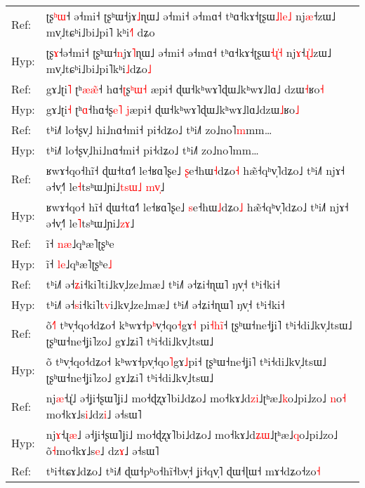 \documentclass[10pt]{article}
\DeclareRobustCommand{\hl}[1]{{\textcolor{red}{#1}}}
\begin{document}
\begin{longtable}{ll}
\midrule 
Ref: & ʈʂ\hl{ʰ}\hl{ɯ}˧\hl{ }ə˧mi˧ ʈʂʰɯ˧jɤ\hl{˩}ɳɯ˩ ə˧mi˧ ə˧mɑ˧ tʰɑ˧kɤ˧ʈʂɯ\hl{˩}\hl{l}\hl{e}\hl{˩} nj\hl{æ}˧zɯ˩ mv̩˩tɕʰi˩bi˩pi˥\hl{ }kʰi\hl{˧}\hl{˥}\hl{ }dʑo \\ 
Hyp: & ʈʂ\hl{ɤ}˧ə˧mi˧ ʈʂʰɯ˧\hl{n}jɤ\hl{˥}ɳɯ˩ ə˧mi˧ ə˧mɑ˧ tʰɑ˧kɤ˧ʈʂɯ\hl{˧}\hl{ɻ}\hl{̍}\hl{˧} nj\hl{ɤ}˧\hl{ɻ}\hl{̍}\hl{˩}zɯ˩ mv̩˩tɕʰi˩bi˩pi˥kʰi\hl{˩}dʑo\hl{˩} \\ 
\midrule 
Ref: & gɤ˩ʈi\hl{˥} ʈʰ\hl{æ}\hl{æ}\hl{̃}˧\hl{ }hɑ˧\hl{ʈ}ʂ\hl{ʰ}\hl{ɯ}\hl{˧}\hl{ }æpi˧ ɖɯ˧kʰwɤ˥ɖɯ˩kʰwɤ˩lɑ˩\hl{ }dzɯ\hl{˧}ʁo\hl{˧} \\ 
Hyp: & gɤ˩ʈi\hl{˧} ʈʰ\hl{ɑ}˧hɑ˧ʂ\hl{e}\hl{˥}\hl{ }\hl{j}æpi˧ ɖɯ˧kʰwɤ˥ɖɯ˩kʰwɤ˩lɑ˩dzɯ\hl{˩}ʁo\hl{˩} \\ 
\midrule 
Ref: & tʰi˩˥ lo˧ʂv̩˩\hl{ }hi˩nɑ˧mi˧ pi˧dʑo˩ tʰi˩˥ zo˩no˥\hl{m}mm… \\ 
Hyp: & tʰi˩˥ lo˧ʂv̩˩hi˩nɑ˧mi˧ pi˧dʑo˩ tʰi˩˥ zo˩no˥mm… \\ 
\midrule 
Ref: & ʁwɤ˧qo˧hĩ˧ ɖɯ˧tɑ˧˥ le˧ʁɑ˥ʂe˩ \hl{ʂ}e˧hɯ\hl{˧}dʑo\hl{˧} hæ̃˧qʰv̩˥dʑo˩ tʰi˩˥ njɤ˧ ə˧v̩˧˥ le\hl{˧}tsʰɯ˩ɲi˩\hl{t}\hl{s}\hl{ɯ}\hl{˩}\hl{ }\hl{m}\hl{v}\hl{̩}˩ \\ 
Hyp: & ʁwɤ˧qo˧\hl{ }hĩ˧ ɖɯ˧tɑ˧˥ le˧ʁɑ˥ʂe˩ \hl{s}e˧hɯ\hl{˩}dʑo\hl{˩} hæ̃˧qʰv̩˥dʑo˩ tʰi˩˥ njɤ˧ ə˧v̩˧˥ le\hl{˥}tsʰɯ˩ɲi˩\hl{z}\hl{ɤ}˩ \\ 
\midrule 
Ref: & ĩ˧ \hl{n}\hl{æ}˩qʰæ˥ʈʂʰe \\ 
Hyp: & ĩ˧ \hl{l}\hl{e}˩qʰæ˥ʈʂʰe\hl{˩} \\ 
\midrule 
Ref: & tʰi˩˥ ə˧\hl{ʑ}i˧ki˥ti˩kv̩˩ze˩mæ˩ tʰi˩˥ ə˧ʑi˧ɳɯ˥ ŋv̩˧ tʰi˧ki˧ \\ 
Hyp: & tʰi˩˥ ə˧\hl{s}i˧ki˥t\hl{v}i˩kv̩˩ze˩mæ˩ tʰi˩˥ ə˧ʑi˧ɳɯ˥ ŋv̩˧ tʰi˧ki˧ \\ 
\midrule 
Ref: & õ\hl{˧}\hl{˥} tʰv̩˧qo˧dʑo˧ kʰwɤ˧p\hl{ʰ}v̩˧qo\hl{˧}gɤ\hl{˧}\hl{ }pi\hl{˧}\hl{h}\hl{i}\hl{̃}˧ ʈʂʰɯ˧ne˧ʝi˥ tʰi˧di˩kv̩˩tsɯ˩ ʈʂʰɯ˧ne˧ʝi˥zo˩ gɤ˩ʑi˥ tʰi˧di˩kv̩˩tsɯ˩ \\ 
Hyp: & õ tʰv̩˧qo˧dʑo˧ kʰwɤ˧pv̩˧qo\hl{˥}gɤ\hl{˩}pi˧ ʈʂʰɯ˧ne˧ʝi˥ tʰi˧di˩kv̩˩tsɯ˩ ʈʂʰɯ˧ne˧ʝi˥zo˩ gɤ˩ʑi˥ tʰi˧di˩kv̩˩tsɯ˩ \\ 
\midrule 
Ref: & nj\hl{æ}˧ɻ\hl{̍}˩ ə˧ʝi˧ʂɯ˥ʝi˩ mo˧ɖʐɤ˥bi˩dʑo˩ mo˧kɤ˩d\hl{z}\hl{i}˩ʈʰæ˩\hl{k}o˩pi˩zo˩ \hl{n}o\hl{˧}\hl{ }mo˧kɤ˩s\hl{i}˩dz\hl{i}˩ ə˧sɯ˥ \\ 
Hyp: & nj\hl{ɤ}˧ɻ\hl{æ}˩ ə˧ʝi˧ʂɯ˥ʝi˩ mo˧ɖʐɤ˥bi˩dʑo˩ mo˧kɤ˩d\hl{ʑ}\hl{ɯ}˩ʈʰæ˩\hl{q}o˩pi˩zo˩ o\hl{̃}\hl{˧}mo˧kɤ˩s\hl{e}˩\hl{ }dz\hl{ɤ}˩ ə˧sɯ˥ \\ 
\midrule 
Ref: & tʰi˧tɕɤ˩dʑo˩ tʰi˩˥ ɖɯ˧pʰo˧hĩ˧bv̩˧ ʝi˧qv̩˥ ɖɯ˧ɭɯ˧ mɤ˧dʑo˧zo\hl{˧} \\ 

\end{longtable}
\end{document}
